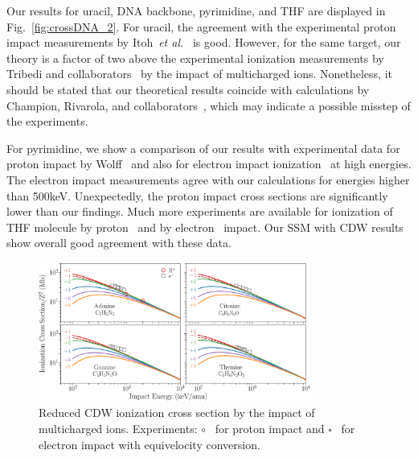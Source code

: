 \documentclass[10pt,showpacs,twocolumn]{revtex4}
\begin{document}
Our results for uracil, DNA backbone, pyrimidine, and THF are displayed 
in Fig.~\ref{fig:crossDNA_2}. For uracil, the agreement with the 
experimental proton impact measurements by 
Itoh~{\it et al.}~\cite{itoh2013} is good.
However, for the same target, our theory is a factor of two above 
the experimental ionization measurements by Tribedi and 
collaborators~\cite{agnihotri2012,agnihotri2013} by the impact of 
multicharged ions.
Nonetheless, it should be stated that our theoretical results coincide 
with calculations by Champion, Rivarola, and 
collaborators~\cite{agnihotri2012,champion2012}, which may indicate a 
possible misstep of the experiments. 

For pyrimidine, we show a comparison of our results with experimental 
data for proton impact by Wolff~\cite{wolff2014} and also for electron
impact ionization~\cite{bug2017} at high energies. 
The electron impact measurements 
agree with our calculations for energies higher than 500keV. 
Unexpectedly, the proton impact cross sections are significantly lower 
than our findings. 
Much more experiments are available for ionization of THF molecule by 
proton~\cite{wang2016} and by electron~\cite{bug2017,wolf2019,fuss2009} 
impact. Our SSM with CDW results show overall good agreement with these
data.

\begin{figure}[t!]
\centering
\includegraphics[width=0.8\textwidth]{figuras/adn1.eps}
\caption{Reduced CDW ionization cross section by the impact of 
multicharged ions. Experiments: \mbox{\Large$\circ$}~\cite{iriki2011} 
for proton impact and $\square$~\cite{rahman2016} for electron impact 
with equivelocity conversion.}
\label{fig:crossDNA_1}
\end{figure} 
\end{document}
